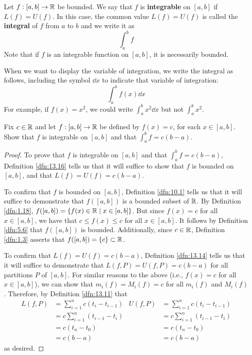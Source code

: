 \documentclass[../main.tex]{subfiles}
\begin{document}
\begin{definition}\label{dfn:13.16}
    Let $f:[a,b]\to\mathbb{R}$ be bounded. We say that $f$ is \textbf{integrable} on $[a,b]$ if $L(f)=U(f)$. In this case, the common value $L(f)=U(f)$ is called the \textbf{integral} of $f$ from $a$ to $b$ and we write it as
    \begin{equation*}
        \int_a^bf
    \end{equation*}
    Note that if $f$ is an integrable function on $[a,b]$, it is necessarily bounded.\par
    When we want to display the variable of integration, we write the integral as follows, including the symbol $\dd{x}$ to indicate that variable of integration:
    \begin{equation*}
        \int_a^bf(x)\dd{x}
    \end{equation*}
    For example, if $f(x)=x^2$, we could write $\int_a^bx^2\dd{x}$ but not $\int_a^bx^2$.
\end{definition}

\begin{exercise}\label{exr:13.17}
    Fix $c\in\mathbb{R}$ and let $f:[a,b]\to\mathbb{R}$ be defined by $f(x)=c$, for each $x\in[a,b]$. Show that $f$ is integrable on $[a,b]$ and that $\int_a^bf=c(b-a)$.
    \begin{proof}
        To prove that $f$ is integrable on $[a,b]$ and that $\int_a^bf=c(b-a)$, Definition \ref{dfn:13.16} tells us that it will suffice to show that $f$ is bounded on $[a,b]$, and that $L(f)=U(f)=c(b-a)$.\par
        To confirm that $f$ is bounded on $[a,b]$, Definition \ref{dfn:10.1} tells us that it will suffice to demonstrate that $f([a,b])$ is a bounded subset of $\mathbb{R}$. By Definition \ref{dfn:1.18}, $f([a,b])=\{f(x)\in\mathbb{R}\mid x\in[a,b]\}$. But since $f(x)=c$ for all $x\in[a,b]$, we have that $c\leq f(x)\leq c$ for all $x\in[a,b]$. It follows by Definition \ref{dfn:5.6} that $f([a,b])$ is bounded. Additionally, since $c\in\mathbb{R}$, Definition \ref{dfn:1.3} asserts that $f([a,b])=\{c\}\subset\mathbb{R}$.\par
        To confirm that $L(f)=U(f)=c(b-a)$, Definition \ref{dfn:13.14} tells us that it will suffice to demonstrate that $L(f,P)=U(f,P)=c(b-a)$ for all partitions $P$ of $[a,b]$. For similar reasons to the above (i.e., $f(x)=c$ for all $x\in[a,b]$), we can show that $m_i(f)=M_i(f)=c$ for all $m_i(f)$ and $M_i(f)$. Therefore, by Definition \ref{dfn:13.11} that
        \begin{align*}
            L(f,P) &= \sum_{i=1}^nc(t_i-t_{i-1})&
                U(f,P) &= \sum_{i=1}^nc(t_i-t_{i-1})\\
            &= c\sum_{i=1}^n(t_{i-1}-t_i)&
                &= c\sum_{i=1}^n(t_{i-1}-t_i)\\
            &= c(t_n-t_0)&
                &= c(t_n-t_0)\\
            &= c(b-a)&
                &= c(b-a)
        \end{align*}
        as desired.
    \end{proof}
\end{exercise}
\end{document}
